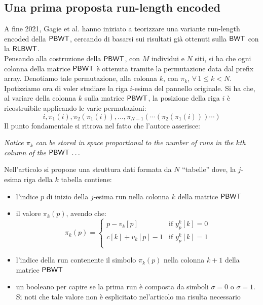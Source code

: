 \subsection{Una prima proposta run-length encoded}
\label{subsectravis}
A fine 2021, Gagie et al. \cite{tricks} hanno iniziato a teorizzare una variante
run-length encoded della $\mbox{\rm {\sf PBWT}}$, cercando di basarsi sui risultati
già ottenuti sulla $\mbox{\rm {\sf BWT}}$ con la $\mbox{\rm {\sf RLBWT}}$.\\
Pensando alla costruzione della $\mbox{\rm {\sf PBWT}}$, con $M$ individui e $N$ siti, si
ha che ogni colonna della 
matrice $\mbox{\rm {\sf PBWT}}$ è ottenuta tramite la permutazione data dal prefix
  array. Denotiamo tale permutazione, alla colonna $k$, con $\pi_k$, $\forall\,
1\leq k<N$. 
Ipotizziamo ora di voler studiare la riga $i$-esima del pannello originale. Si
ha che, al variare della colonna $k$ sulla matrice $\mbox{\rm {\sf PBWT}}$, la posizione
della riga $i$ è ricostruibile applicando le varie permutazioni:
\begin{equation}
  \label{eq:pbwttrick}
  i, \pi_1(i), \pi_2(\pi_1(i)),\ldots,
  \pi_{N-1}(\cdots(\pi_2(\pi_1(i)))\cdots)
\end{equation}
Il punto fondamentale si ritrova nel fatto che l'autore asserisce:
\begin{center}
  \textit{Notice $\pi_k$ can be stored in space proportional to the number of
    runs in the $k$th column of the $\mbox{\rm {\sf PBWT}}\,\ldots$} 
\end{center}
Nell'articolo si propone una struttura dati formata da $N$ ``tabelle''
dove, la $j$-esima riga della $k$ tabella contiene: 
\begin{itemize}
  \item l'indice $p$ di inizio della $j$-esima run nella colonna $k$ della
   matrice $\mbox{\rm {\sf PBWT}}$
  \item il valore $\pi_k(p)$, avendo che:
  \begin{equation}
    \label{eq:pbwttrick1}
    \pi_k(p)=
    \begin{cases}
      p-v_k[p]&\mbox{if } y_p^k[k]=0\\
      c[k]+v_k[p]-1&\mbox{if } y_p^k[k]=1\\
    \end{cases}
  \end{equation}
  \item l'indice della run contenente il simbolo $\pi_k(p)$ nella colonna $k+1$
  della matrice $\mbox{\rm {\sf PBWT}}$
  \item un booleano per capire se la prima run è composta da simboli $\sigma=0$
  o $\sigma =1$. Si noti che tale valore non è esplicitato nel'articolo ma
  risulta necessario
\end{itemize}
